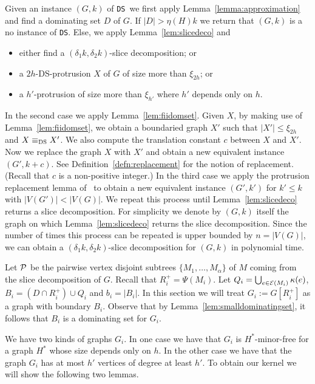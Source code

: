 \documentclass[11pt]{article}
\newcommand{\tDS}{{\texttt{\sc DS}}}
\begin{document}
Given an instance $(G,k)$ of \tDS \,  we first apply Lemma~\ref{lemma:approximation} and find  a dominating set $D$ of $G$. 
If $|D|>\eta(H)k$ we return that $(G,k)$ is a {\sc no} instance of \tDS. Else, 
we apply Lemma~\ref{lem:slicedeco} and
\begin{itemize}
\item  either find  a $(\delta_1k,\delta_2 k)$-slice decomposition; or 
\item a $2h$-{\sc DS}-protrusion $X$ of $G$ 
of size more than $\xi_{2h}$; or
\item a $h'$-protrusion of size more than $\xi_{h'}$ where $h'$ depends only on $h$.
\end{itemize}
In the second case we apply Lemma~\ref{lem:fiidomset}. Given $X$, by making use of  Lemma~\ref{lem:fiidomset}, we obtain a boundaried graph $X'$ such that $|X'|\leq \xi_{2h}$ and $X\equiv_{\tDS} X'$.  
We also compute the translation constant $c$ between $X$ 
and $X'$.  Now we replace the graph $X$ with $X'$ and obtain a new equivalent instance $(G',k+c)$. See  Definition~\ref{defn:replacement} for the notion of replacement. (Recall that $c$ is a non-positive integer.) In the third case we apply the protrusion replacement lemma of~\cite[Lemma~7]{H.Bodlaender:2009ng} to obtain a new equivalent instance $(G',k')$ for $k' \leq k$ with $|V(G')| < |V(G)|$. We repeat this process until Lemma~\ref{lem:slicedeco}  returns a slice decomposition. 
For simplicity we denote by $(G,k)$ itself the graph on which Lemma~\ref{lem:slicedeco} returns the slice decomposition. Since the number of times this process can be repeated is upper bounded by $n=|V(G)|$, we can obtain a $(\delta_1k,\delta_2 k)$-slice decomposition for $(G,k)$ in polynomial time.   




Let $\cal P$ be the pairwise vertex disjoint  subtrees $\{M_1,\ldots,M_\alpha\}$  of $M$ coming 
from the slice decomposition of $G$. Recall that $R_i^+= \Psi(M_i)$.
Let  $Q_i=\bigcup _{e\in {\cal E}(M_i)}\kappa(e)$, $B_i=(D \cap R_i^+)\cup Q_i$ and $b_i=|B_i|$.  
In this section we will treat  $G_i:=G[R_{i}^+]$ as a  graph with boundary $B_i$.  
Observe that by Lemma~\ref{lem:smalldominatingset}, it follows that 
$B_i$ is a dominating set for $G_i$. 

We have two kinds of graphs $G_i$. In one case we have that $G_i$ is $H^*$-minor-free for a graph $H^*$ whose size  depends only on $h$. In the other case we have that the graph $G_i$ has at most $h'$ vertices of degree at least $h'$. To obtain our kernel we will show the following  two lemmas. 
\end{document}
